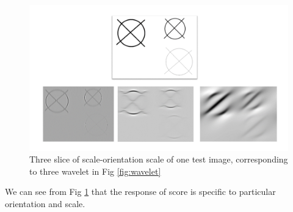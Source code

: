 \documentclass{article}
\begin{document}
	\begin{figure}[h]
		\centering
		\includegraphics[width=12cm]{scores.png}
		\caption{Three slice of scale-orientation scale of one test image, corresponding to three wavelet in Fig \ref{fig:wavelet}}
		\label{fig:score}
	\end{figure}
	We can see from Fig \ref{fig:score} that the response of score is specific to particular orientation and scale.


\end{document}
